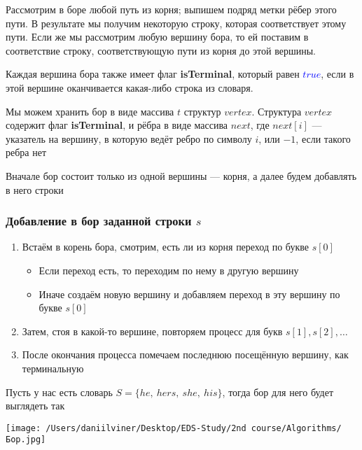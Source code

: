 \documentclass[a4paper]{article}
\begin{document}
Рассмотрим в боре любой путь из корня; выпишем подряд метки рёбер этого пути. В результате мы получим некоторую строку, которая соответствует этому пути. Если же мы рассмотрим любую вершину бора, то ей поставим в соответствие строку, соответствующую пути из корня до этой вершины.

Каждая вершина бора также имеет флаг \textbf{isTerminal}, который равен \textcolor{blue}{$true$}, если в этой вершине оканчивается какая-либо строка из словаря.



Мы можем хранить бор в виде массива $t$ структур $vertex$. Структура  $vertex$ содержит флаг \textbf{isTerminal}, и рёбра в виде массива $next$, где  $next[i]$ — указатель на вершину, в которую ведёт ребро по символу $i$, или $-1$, если такого ребра нет

Вначале бор состоит только из одной вершины — корня, а далее будем добавлять в него строки

\subsubsection*{Добавление в бор заданной строки $s$}
\begin{enumerate}
    \item Встаём в корень бора, смотрим, есть ли из корня переход по букве $s[0]$
    \begin{itemize}
        \item Если переход есть, то переходим по нему в другую вершину
        \item Иначе создаём новую вершину и добавляем переход в эту вершину по букве $s[0]$
    \end{itemize}
    \item Затем, стоя в какой-то вершине, повторяем процесс для букв $s[1],s[2],\ldots$
    \item После окончания процесса помечаем последнюю посещённую вершину, как терминальную
\end{enumerate}

\ex Пусть у нас есть словарь $S=\{he,\ hers,\ she,\ his\}$, тогда бор для него будет выглядеть так

\begin{center}
    \texttt{[image: /Users/daniilviner/Desktop/EDS-Study/2nd course/Algorithms/Бор.jpg]}
\end{center}
\end{document}
